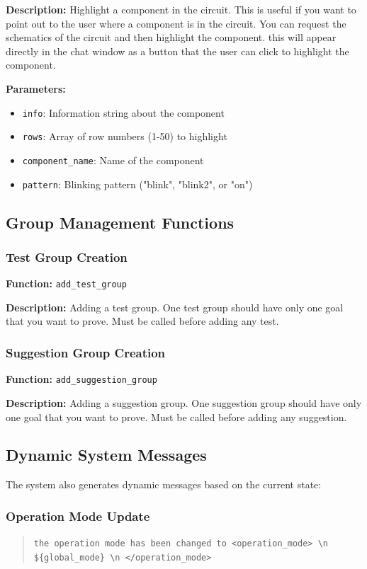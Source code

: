 \textbf{Description:} Highlight a component in the circuit. This is useful if you want to point out to the user where a component is in the circuit. You can request the schematics of the circuit and then highlight the component. this will appear directly in the chat window as a button that the user can click to highlight the component.

\textbf{Parameters:}
\begin{itemize}
    \item \texttt{info}: Information string about the component
    \item \texttt{rows}: Array of row numbers (1-50) to highlight
    \item \texttt{component\_name}: Name of the component
    \item \texttt{pattern}: Blinking pattern ("blink", "blink2", or "on")
\end{itemize}

\subsection{Group Management Functions}

\subsubsection{Test Group Creation}
\textbf{Function:} \texttt{add\_test\_group}

\textbf{Description:} Adding a test group. One test group should have only one goal that you want to prove. Must be called before adding any test.

\subsubsection{Suggestion Group Creation}
\textbf{Function:} \texttt{add\_suggestion\_group}

\textbf{Description:} Adding a suggestion group. One suggestion group should have only one goal that you want to prove. Must be called before adding any suggestion.

\subsection{Dynamic System Messages}

The system also generates dynamic messages based on the current state:

\subsubsection{Operation Mode Update}
\begin{quote}
\texttt{the operation mode has been changed to <operation\_mode> \textbackslash{}n \$\{global\_mode\} \textbackslash{}n </operation\_mode>}
\end{quote}

